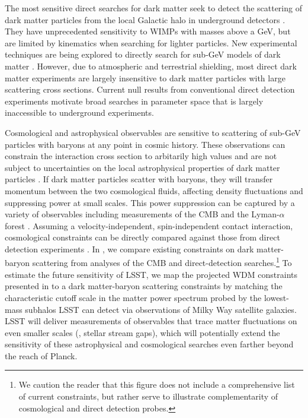 The most sensitive direct searches for dark matter seek to detect the scattering of dark matter particles from the local Galactic halo in underground detectors \citep[\eg,][]{1509.08767}. 
They have unprecedented sensitivity to WIMPs with masses above a GeV, but are limited by kinematics when searching for lighter particles. 
New experimental techniques are being explored to directly search for sub-GeV models of dark matter \citep{Battaglieri:2017aum}. 
However, due to atmospheric and terrestrial shielding, most direct dark matter experiments are largely insensitive to dark matter particles with large scattering cross sections. 
Current null results from conventional direct detection experiments motivate broad searches in parameter space that is largely inaccessible to underground experiments. 


Cosmological and astrophysical observables are sensitive to scattering of sub-GeV particles with baryons at any point in cosmic history. 
These observations can constrain the interaction cross section to arbitarily high values and are not subject to uncertainties on the local astrophysical properties of dark matter particles \citep[\eg,][]{1210.2721,1404.1938}. 
If dark matter particles scatter with baryons, they will transfer momentum between the two cosmological fluids, affecting density fluctuations and suppressing power at small scales. 
This power suppression can be captured by a variety of observables including measurements of the CMB \citep{1311.2937,Gluscevic:2017ywp} and the Lyman-$\alpha$ forest \citep{Xu:2018efh}.
Assuming a velocity-independent, spin-independent contact interaction, cosmological constraints can be directly compared against those from direct detection experiments \citep[\eg,][]{Boddy:2018kfv}.
In , we compare existing constraints on dark matter-baryon scattering from analyses of the CMB and direct-detection searches.\footnote{We caution the reader that this figure does not include a comprehensive list of current constraints, but rather serve to illustrate complementarity of cosmological and direct detection probes.} 
To estimate the future sensitivity of LSST, we map the projected WDM constraints presented in  to a dark matter-baryon scattering constraints by matching the characteristic cutoff scale in the matter power spectrum probed by the lowest-mass subhalos LSST can detect via observations of Milky Way satellite galaxies. 
LSST will deliver measurements of observables that trace matter fluctuations on even smaller scales (\eg, stellar stream gaps), which will potentially extend the sensitivity of these astrophysical and cosmological searches even farther beyond the reach of Planck.
